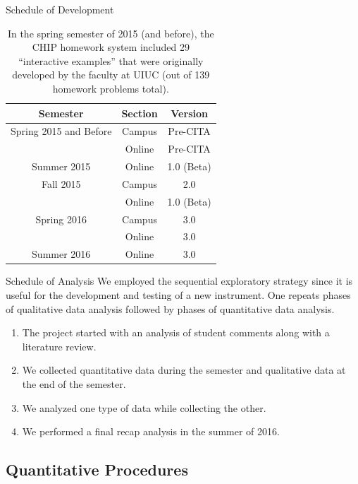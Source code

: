 \documentclass[xcolor=x11names,compress]{beamer}
\begin{document}
\begin{frame}{Schedule of Development}
	\begin{table}[ht]
		\caption{In the spring semester of 2015 (and before), the CHIP homework system included 29 ``interactive examples'' that were originally developed by the faculty at UIUC (out of 139 homework problems total).}
		\begin{center}
			\begin{tabular}{|c|c|c|}
				\hline
				\textbf{Semester} & \textbf{Section} & \textbf{Version}\\
				\hline
				Spring 2015 and Before & Campus & Pre-CITA\\
				& Online & Pre-CITA\\
				\hline
				Summer 2015 & Online & 1.0 (Beta)\\
				\hline
				Fall 2015 & Campus & 2.0\\
				& Online & 1.0 (Beta)\\
				\hline
				Spring 2016 & Campus & 3.0\\
				& Online & 3.0\\
				\hline
				Summer 2016 & Online & 3.0\\
				\hline
			\end{tabular}
		\end{center}
		\label{tab:schedule}
	\end{table}
\end{frame}

\begin{frame}{Schedule of Analysis}
	We employed the sequential exploratory strategy since it is useful for the development and testing of a new instrument. One repeats phases of qualitative data analysis followed by phases of quantitative data analysis.
	\vspace{3mm}
	\begin{enumerate}
		\item The project started with an analysis of student comments along with a literature review.
		\item We collected quantitative data during the semester and qualitative data at the end of the semester.
		\item We analyzed one type of data while collecting the other.
		\item We performed a final recap analysis in the summer of 2016.
	\end{enumerate}
\end{frame}

\subsection{Quantitative Procedures}
\end{document}

